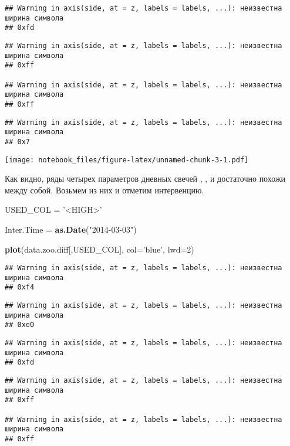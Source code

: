 \documentclass[
]{article}
\newenvironment{Shaded}{\begin{snugshade}}{\end{snugshade}}
\newcommand{\DataTypeTok}[1]{\textcolor[rgb]{0.13,0.29,0.53}{#1}}
\newcommand{\DecValTok}[1]{\textcolor[rgb]{0.00,0.00,0.81}{#1}}
\newcommand{\KeywordTok}[1]{\textcolor[rgb]{0.13,0.29,0.53}{\textbf{#1}}}
\newcommand{\NormalTok}[1]{#1}
\newcommand{\StringTok}[1]{\textcolor[rgb]{0.31,0.60,0.02}{#1}}
\begin{document}
\begin{verbatim}
## Warning in axis(side, at = z, labels = labels, ...): неизвестна ширина символа
## 0xfd
\end{verbatim}

\begin{verbatim}
## Warning in axis(side, at = z, labels = labels, ...): неизвестна ширина символа
## 0xff

## Warning in axis(side, at = z, labels = labels, ...): неизвестна ширина символа
## 0xff
\end{verbatim}

\begin{verbatim}
## Warning in axis(side, at = z, labels = labels, ...): неизвестна ширина символа
## 0x7
\end{verbatim}

\texttt{[image: notebook\_files/figure-latex/unnamed-chunk-3-1.pdf]}

Как видно, ряды четырех параметров дневных свечей , , и достаточно
похожи между собой. Возьмем из них и отметим интервенцию.

\begin{Shaded}
\begin{Highlighting}[]
\NormalTok{USED_COL =}\StringTok{ '<HIGH>'}

\NormalTok{Inter.Time =}\StringTok{ }\KeywordTok{as.Date}\NormalTok{(}\StringTok{"2014-03-03"}\NormalTok{)}

\KeywordTok{plot}\NormalTok{(data.zoo.diff[,USED_COL], }\DataTypeTok{col=}\StringTok{'blue'}\NormalTok{, }\DataTypeTok{lwd=}\DecValTok{2}\NormalTok{)}
\end{Highlighting}
\end{Shaded}

\begin{verbatim}
## Warning in axis(side, at = z, labels = labels, ...): неизвестна ширина символа
## 0xf4
\end{verbatim}

\begin{verbatim}
## Warning in axis(side, at = z, labels = labels, ...): неизвестна ширина символа
## 0xe0
\end{verbatim}

\begin{verbatim}
## Warning in axis(side, at = z, labels = labels, ...): неизвестна ширина символа
## 0xfd
\end{verbatim}

\begin{verbatim}
## Warning in axis(side, at = z, labels = labels, ...): неизвестна ширина символа
## 0xff

## Warning in axis(side, at = z, labels = labels, ...): неизвестна ширина символа
## 0xff
\end{verbatim}
\end{document}
